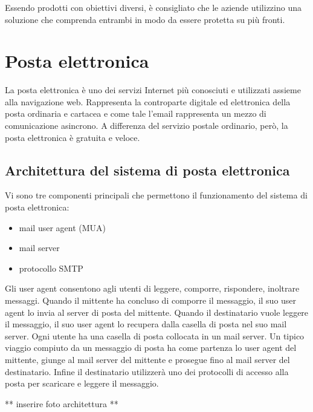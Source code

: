     \subsubsection*{}     
    Essendo prodotti con obiettivi diversi, è consigliato che le aziende utilizzino una soluzione che comprenda entrambi
    in modo da essere protetta su più fronti.


\pagebreak
\section{Posta elettronica}
La posta elettronica è uno dei servizi Internet più conosciuti e utilizzati assieme alla navigazione web. 
Rappresenta la controparte digitale ed elettronica della posta ordinaria e cartacea e come tale l’email 
rappresenta un mezzo di comunicazione asincrono. A differenza del servizio postale ordinario, però, 
la posta elettronica è gratuita e veloce.\cite{posta}

\subsection{Architettura del sistema di posta elettronica}
Vi sono tre componenti principali che permettono il funzionamento del sistema di posta elettronica:
\begin{itemize}
    \item mail user agent (MUA)
    \item mail server
    \item protocollo SMTP
\end{itemize}
Gli user agent consentono agli utenti di leggere, comporre, rispondere, inoltrare messaggi. 
Quando il mittente ha concluso di comporre il messaggio, il suo user agent lo invia al server di posta del mittente. 
Quando il destinatario vuole leggere il messaggio, il suo user agent lo recupera dalla casella di posta nel suo mail server. 
Ogni utente ha una casella di posta collocata in un mail server.
Un tipico viaggio compiuto da un messaggio di posta ha come partenza lo user agent del mittente, 
giunge al mail server del mittente e prosegue fino al mail server del destinatario. 
Infine il destinatario utilizzerà uno dei protocolli di accesso alla posta per scaricare e leggere il messaggio.
\cite{kurose2008reti}

** inserire foto architettura **

